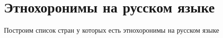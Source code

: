 \section{Этнохоронимы на русском языке}

Построим список стран у которых есть этнохоронимы на русском языке
